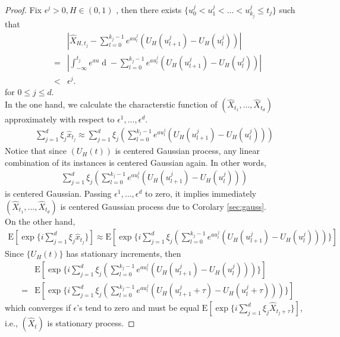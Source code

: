 \documentclass[a4paper, twoside, 11pt]{article}
\theoremstyle{definition}
\newcommand{\brkt}[1]{\left({#1} \right)}
\begin{document}
\begin{proof}
  Fix $\epsilon^j > 0, H\in (0,1)$ , then there exists  $\{u_0^j<u_1^j<\dots<u^j_{k_j}\le t_j\}$ such that
  \begin{eqnarray*}
	&&|\hat{X}_{H,t_j} - \sum_{l=0}^{k_j-1} e^{au^j_l}(U_H(u^j_{l+1}) - U_H(u^j_{l}))|\\
	&=& |\int_{-\infty}^{t_j} e^{au}\mathop{dU_H(u)} - \sum_{l=0}^{k_j-1} e^{au^j_l}(U_H(u^j_{l+1}) - U_H(u^j_{l}))|\\
	&<& \epsilon^j.
  \end{eqnarray*}
  for $0 \le j \le d $.\\
  In the one hand, we calculate the characterstic function of $(\hat{X}_{t_1},\dots, \hat{X}_{t_d})$ approximately with respect to $\epsilon^1,\dots,\epsilon^d$.
  \begin{eqnarray*}
	\sum_{j=1}^d \xi_j\hat{x}_{t_j} \approx \sum_{j=1}^d \xi_j\brkt{\sum_{l=0}^{k_j-1} e^{au^j_l}(U_H(u^j_{l+1}) - U_H(u^j_{l}))}
  \end{eqnarray*}
  Notice that since $(U_H(t))$ is centered Gaussian process, any linear combination of its instances is centered Gaussian again. In other words, 
  \begin{eqnarray*}
	\sum_{j=1}^d \xi_j \brkt{\sum_{l=0}^{k_j-1} e^{au^j_l}(U_H(u^j_{l+1}) - U_H(u^j_{l})) }
  \end{eqnarray*}
  is centered Gaussian. Passing $\epsilon^1,\dots,\epsilon^d$ to zero, it implies immediately $(\hat{X}_{t_1},\dots, \hat{X}_{t_d})$ is centered Gaussian process due to Corolary \ref{sec:gauss}.\\
  On the other hand,
	\begin{eqnarray*}
	\mathrm{E}[\exp\{i\sum_{j=1}^d \xi_j\hat{x}_{t_j }\}] \approx \mathrm{E}[\exp\{ i\sum_{j=1}^d \xi_j\brkt{\sum_{l=0}^{k_j-1} e^{au^j_l}(U_H(u^j_{l+1}) - U_H(u^j_{l})) }\}]
  \end{eqnarray*}
  Since $\{U_H(t)\}$ has stationary increments, then 
  \begin{eqnarray*}
	&& \mathrm{E}[\exp\{ i\sum_{j=1}^d \xi_j\brkt{\sum_{l=0}^{k_j-1} e^{au^j_l}(U_H(u^j_{l+1}) - U_H(u^j_{l})) }\}] \\
	&=& \mathrm{E}[\exp\{ i\sum_{j=1}^d \xi_j\brkt{\sum_{l=0}^{k_j-1} e^{au^j_l}(U_H(u^j_{l+1}+\tau) - U_H(u^j_{l}+\tau)) }\}]
  \end{eqnarray*}
  which converges if $\epsilon$'s tend to zero and must be equal $\mathrm{E}[\exp\{ i\sum_{j=1}^d \xi_j \hat{X}_{t_j+\tau}\}]$, i.e., $(\hat{X}_t)$ is stationary process.
\end{proof}
\end{document}
